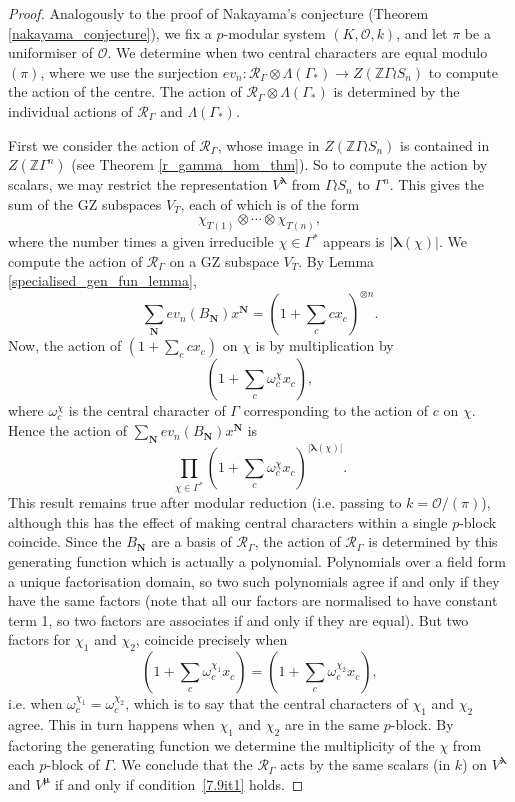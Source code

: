 \documentclass[ALCO,Unicode]{cedram}
\newcommand{\bs}{\boldsymbol}
\newcommand{\RGamma}{\mathcal{R}_{\Gamma}}
\newcommand{\LambdaG}{\Lambda(\Gamma_*)}
\newcommand{\RGamma}{\mathcal{R}_{\Gamma}}
\newcommand{\LambdaG}{\Lambda(\Gamma_*)}
\begin{document}
\begin{proof}
Analogously to the proof of Nakayama's conjecture (Theorem \ref{nakayama_conjecture}), we fix a $p$-modular system $(K, \mathcal{O}, k)$, and let $\pi$ be a uniformiser of $\mathcal{O}$. We determine when two central characters are equal modulo $(\pi)$, where we use the surjection $ev_n: \RGamma \otimes \LambdaG \to Z(\mathbb{Z}\Gamma \wr S_n)$ to compute the action of the centre. The action of $\RGamma \otimes \LambdaG$ is determined by the individual actions of $\RGamma$ and $\LambdaG$. 

First we consider the action of $\RGamma$, whose image in $Z(\mathbb{Z}\Gamma \wr S_n)$ is contained in $Z(\mathbb{Z} \Gamma^n)$ (see Theorem \ref{r_gamma_hom_thm}). So to compute the action by scalars, we may restrict the representation $V^{\bs\lambda}$ from $\Gamma \wr S_n$ to $\Gamma^n$. This gives the sum of the GZ subspaces $V_T$, each of which is of the form
\[
\chi_{T(1)} \otimes \cdots \otimes \chi_{T(n)},
\]
where the number times a given irreducible $\chi \in \Gamma^*$ appears is $|\bs\lambda(\chi)|$. We compute the action of $\RGamma$ on a GZ subspace $V_T$. By Lemma \ref{specialised_gen_fun_lemma},
\[
\sum_{\mathbf{N} } ev_n(B_{\mathbf{N}}) x^{\mathbf{N}} = (1 + \sum_c c x_c)^{\otimes n}.
\]
Now, the action of $(1 + \sum_c c x_c)$ on $\chi$ is by multiplication by
\[
(1 + \sum_c \omega_{c}^\chi x_c),
\]
where $\omega_c^\chi$ is the central character of $\Gamma$ corresponding to the action of $c$ on $\chi$. Hence the action of $\sum_{\mathbf{N} } ev_n(B_{\mathbf{N}}) x^{\mathbf{N}}$ is
\[
\prod_{\chi \in \Gamma^*} (1 + \sum_c \omega_{c}^\chi x_c)^{|\bs\lambda(\chi)|}.
\]
This result remains true after modular reduction (i.e. passing to $k = \mathcal{O}/(\pi)$), although this has the effect of making central characters within a single $p$-block coincide. Since the $B_{\mathbf{N}}$ are a basis of $\RGamma$, the action of $\RGamma$ is determined by this generating function which is actually a polynomial. Polynomials over a field form a unique factorisation domain, so two such polynomials agree if and only if they have the same factors (note that all our factors are normalised to have constant term 1, so two factors are associates if and only if they are equal). But two factors for $\chi_1$ and $\chi_2$, coincide precisely when
\[
(1 + \sum_c \omega_{c}^{\chi_1} x_c) = (1 + \sum_c \omega_{c}^{\chi_2} x_c),
\]
i.e. when $\omega_c^{\chi_1} = \omega_c^{\chi_2}$, which is to say that the central characters of $\chi_1$ and $\chi_2$ agree. This in turn happens when $\chi_1$ and $\chi_2$ are in the same $p$-block. By factoring the generating function we determine the multiplicity of the $\chi$ from each $p$-block of $\Gamma$. We conclude that the $\RGamma$ acts by the same scalars (in $k$) on $V^{\bs\lambda}$ and $V^{\bs\mu}$ if and only if condition~\ref{7.9it1} holds.


\end{proof}
\end{document}
